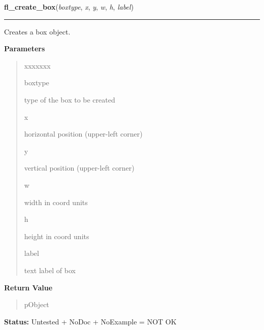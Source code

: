 \hspace{.8\funcindent}\begin{boxedminipage}{\funcwidth}

    \raggedright \textbf{fl\_create\_box}(\textit{boxtype}, \textit{x}, \textit{y}, \textit{w}, \textit{h}, \textit{label})

    \vspace{-1.5ex}

    \rule{\textwidth}{0.5\fboxrule}
\setlength{\parskip}{2ex}
    Creates a box object.

\setlength{\parskip}{1ex}
      \textbf{Parameters}
      \vspace{-1ex}

      \begin{quote}
        \begin{Ventry}{xxxxxxx}

          \item[boxtype]

          type of the box to be created

          \item[x]

          horizontal position (upper-left corner)

          \item[y]

          vertical position (upper-left corner)

          \item[w]

          width in coord units

          \item[h]

          height in coord units

          \item[label]

          text label of box

        \end{Ventry}

      \end{quote}

      \textbf{Return Value}
    \vspace{-1ex}

      \begin{quote}
      pObject

      \end{quote}

\textbf{Status:} Untested + NoDoc + NoExample = NOT OK



    \end{boxedminipage}

